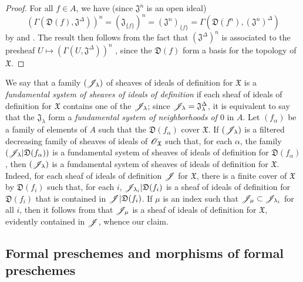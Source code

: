 \begin{proof}
\label{proof-1.10.3.6}
For all $f\in A$, we have (since $\mathfrak{J}^n$ is an open ideal)
\[
  (\Gamma(\mathfrak{D}(f),\mathfrak{J}^\Delta))^n=(\mathfrak{J}_{\{f\}})^n=(\mathfrak{J}^n)_{\{f\}}=\Gamma(\mathfrak{D}(f^n),(\mathfrak{J}^n)^\Delta)
\]
by  and .
The result then follows from the fact that $(\mathfrak{J}^\Delta)^n$ is associated to the presheaf $U\mapsto(\Gamma(U,\mathfrak{J}^\Delta))^n$ , since the $\mathfrak{D}(f)$ form a basis for the topology of $\mathfrak{X}$.
\end{proof}

\begin{env}[10.3.7]
\label{1.10.3.7}
We say that a family $(\mathscr{J}_\lambda)$ of sheaves of ideals of definition for $\mathfrak{X}$ is a \emph{fundamental system of sheaves of ideals of definition} if each sheaf of ideals of definition for $\mathfrak{X}$ contains one of the $\mathscr{J}_\lambda$; since $\mathscr{J}_\lambda=\mathfrak{J}_\lambda^\Delta$, it is equivalent to say that the $\mathfrak{J}_\lambda$ form a \emph{fundamental system of neighborhoods of $0$} in $A$.
Let $(f_\alpha)$ be a family of elements of $A$ such that the $\mathfrak{D}(f_\alpha)$ cover $\mathfrak{X}$.
If $(\mathscr{J}_\lambda)$ is a filtered decreasing family of sheaves of ideals of $\mathscr{O}_\mathfrak{X}$ such that, for each $\alpha$, the family $(\mathscr{J}_\lambda|\mathfrak{D}(f_\alpha))$ is a fundamental system of sheaves of ideals of definition for $\mathfrak{D}(f_\alpha)$, then $(\mathscr{J}_\lambda)$ is a fundamental system of sheaves of ideals of definition for $\mathfrak{X}$.
Indeed, for each sheaf of ideals of definition $\mathscr{J}$ for $\mathfrak{X}$, there is a finite cover of $\mathfrak{X}$ by $\mathfrak{D}(f_i)$ such that, for each $i$, $\mathscr{J}_{\lambda_i}|\mathfrak{D}(f_i)$ is a sheaf of ideals of definition for $\mathfrak{D}(f_i)$ that is contained in $\mathscr{J}|\mathfrak{D}(f_i)$.
If $\mu$ is an index such that $\mathscr{J}_\mu\subset\mathscr{J}_{\lambda_i}$ for all $i$, then it follows from  that $\mathscr{J}_\mu$ is a sheaf of ideals of definition for $\mathfrak{X}$, evidently contained in $\mathscr{J}$, whence our claim.
\end{env}

\subsection{Formal preschemes and morphisms of formal preschemes}
\label{subsection:1.10.4}

